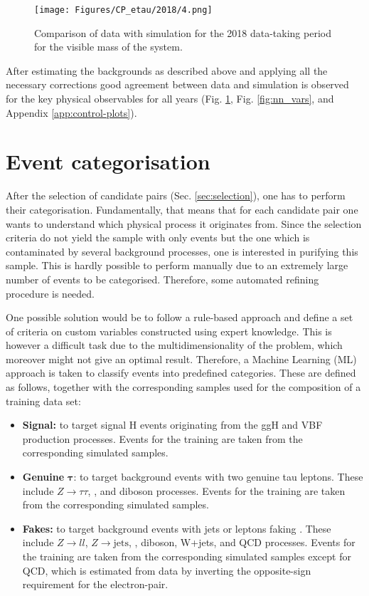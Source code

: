 \begin{figure}[t!]
    \centering
    \texttt{[image: Figures/CP\_etau/2018/4.png]}
    \caption{Comparison of data with simulation for the 2018 data-taking period for the visible mass of the \et system.}
    \label{fig:mvis}
\end{figure}

After estimating the backgrounds as described above and applying all the necessary corrections good agreement between data and simulation is observed for the key physical observables for all years (Fig. \ref{fig:mvis}, Fig. \ref{fig:nn_vars}, and Appendix \ref{app:control-plots}). 

\section{Event categorisation}\label{sec:categ}
After the selection of \et candidate pairs (Sec. \ref{sec:selection}), one has to perform their categorisation. Fundamentally, that means that for each candidate pair one wants to understand which physical process it originates from. Since the selection criteria do not yield the sample with only \htt events but the one which is contaminated by several background processes, one is interested in purifying this sample. This is hardly possible to perform manually due to an extremely large number of events to be categorised. Therefore, some automated refining procedure is needed.

One possible solution would be to follow a rule-based approach and define a set of criteria on custom variables constructed using expert knowledge. This is however a difficult task due to the multidimensionality of the problem, which moreover might not give an optimal result. Therefore, a Machine Learning (ML) approach is taken to classify events into predefined categories. These are defined as follows, together with the corresponding samples used for the composition of a training data set:

\begin{itemize}
    \item \textbf{Signal:} to target signal H events originating from the ggH and VBF production processes. Events for the training are taken from the corresponding simulated samples.
    \item \textbf{Genuine} $\mathbf{\tau}$: to target background events with two genuine tau leptons. These include $Z\to\tau\tau$, \ttbar, and diboson processes. Events for the training are taken from the corresponding simulated samples.
    \item \textbf{Fakes:} to target background events with jets or leptons faking \tauh. These include $Z\to ll$, $Z\to \text{jets}$, \ttbar, diboson, W+jets, and QCD processes. Events for the training are taken from the corresponding simulated samples except for QCD, which is estimated from data by inverting the opposite-sign requirement for the electron-\tauh pair. 
\end{itemize}

